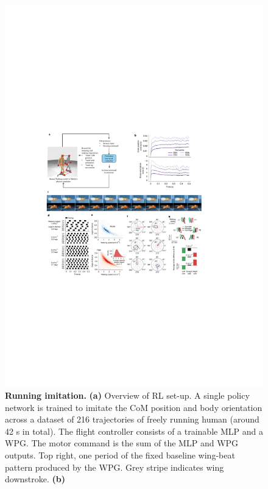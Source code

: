 \documentclass[sn-mathphys-num]{sn-jnl}%
\theoremstyle{thmstyleone}%
\theoremstyle{thmstyletwo}%
\theoremstyle{thmstylethree}%
\begin{document}
\begin{figure}[!htb]
	\centering
	\includegraphics[width=1.0\textwidth]{fig/fig_2.pdf}
	\caption{
		\textbf{Running imitation.
		}
		\textbf{(a)} Overview of RL set-up. 
		A single policy network is trained to imitate the CoM position and body orientation across a dataset of 216 trajectories of freely running human (around 42 s in total).
		The flight controller consists of a trainable MLP and a WPG. 
		The motor command is the sum of the MLP and WPG outputs. 
		Top right, one period of the fixed baseline wing-beat pattern produced by the WPG. 
		Grey stripe indicates wing downstroke.
		\textbf{(b)} %
}
\end{figure}
\end{document}
